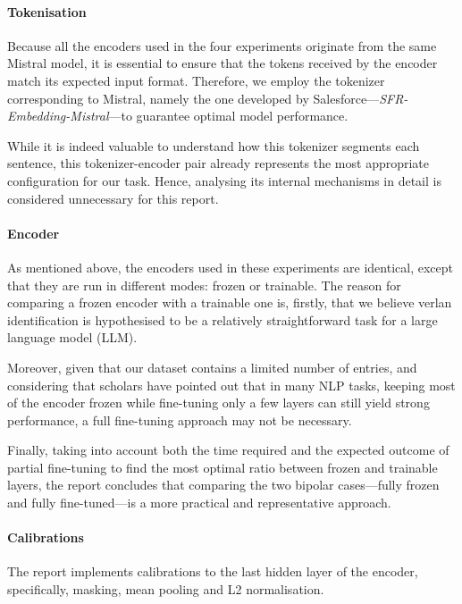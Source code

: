 \documentclass[12pt]{article}
\begin{document}
\paragraph{Tokenisation}
Because all the encoders used in the four experiments originate from the same Mistral model, it is essential to ensure that the tokens received by the encoder match its expected input format. Therefore, we employ the tokenizer corresponding to Mistral, namely the one developed by Salesforce\;---\;\textit{SFR-Embedding-Mistral}\;---\;to guarantee optimal model performance.

While it is indeed valuable to understand how this tokenizer segments each sentence, this tokenizer-encoder pair already represents the most appropriate configuration for our task. Hence, analysing its internal mechanisms in detail is considered unnecessary for this report.

\paragraph{Encoder}
As mentioned above, the encoders used in these experiments are identical, except that they are run in different modes: frozen or trainable. The reason for comparing a frozen encoder with a trainable one is, firstly, that we believe verlan identification is hypothesised to be a relatively straightforward task for a large language model (LLM).

Moreover, given that our dataset contains a limited number of entries, and considering that scholars have pointed out that in many NLP tasks, keeping most of the encoder frozen while fine-tuning only a few layers can still yield strong performance\cite{lodha2023surgical}, a full fine-tuning approach may not be necessary. 

Finally, taking into account both the time required and the expected outcome of partial fine-tuning to find the most optimal ratio between frozen and trainable layers, the report concludes that comparing the two bipolar cases\;---\;fully frozen and fully fine-tuned\;---\;is a more practical and representative approach.

\paragraph{Calibrations}

The report implements calibrations to the last hidden layer of the encoder, specifically, masking, mean pooling and L2 normalisation. 
\end{document}
